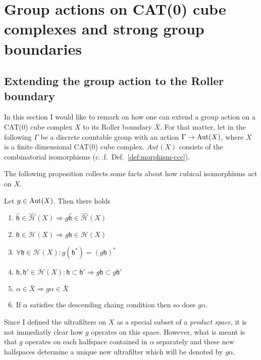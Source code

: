 \section{Group actions on CAT(0) cube complexes and strong group boundaries}
\label{sec:group}

\subsection{Extending the group action to the Roller boundary}
\label{sec:ga-roller}

In this section I would like to remark on how one can extend a group action on a CAT(0) cube complex \(X\) to its Roller boundary \(\bar X\). For that matter, let in the following \(\Gamma\) be a discrete countable group with an action \(\Gamma \to \operatorname{Aut}(X)\), where \(X\) is a finite dimensional CAT(0) cube complex. \(Aut(X)\) consists of the combinatorial isomorphisms (c.\,.f.\ Def.~\ref{def:morphism-ccc}).

The following proposition collects some facts about how cubical isomorphisms act on \(X\).

\begin{prop}
  Let \(g \in \operatorname{Aut}(X)\). Then there holds
  \begin{enumerate}
  \item \(\mathfrak{\hat h} \in \mathcal{\hat H}(X) \Rightarrow  g\mathfrak{\hat h} \in \mathcal{\hat H}(X)\)
  \item \(\mathfrak{h} \in \mathcal{H}(X) \Rightarrow  g\mathfrak{h} \in \mathcal{H}(X)\)
  \item \(\forall \mathfrak{h} \in \mathcal{H}(X)\colon g(\mathfrak{h}^\ast) = (g\mathfrak{h})^\ast\)
  \item \(\mathfrak{h,h'} \in \mathcal{H}(X)\colon \mathfrak{h} \subset \mathfrak{h'} \Rightarrow g\mathfrak{h} \subset g\mathfrak{h'}\)
  \item \(\alpha \in \bar X \Rightarrow g\alpha \in \bar X\)
  \item If \(\alpha\) satisfies the descending chaing condition then so does \(g\alpha\).
  \end{enumerate}
\end{prop}

\begin{rem}
  Since I defined the ultrafilters on \(X\) as a special subset of a \emph{product space}, it is not immediatly clear how \(g\) operates on this space. However, what is meant is that \(g\) operates on each halfspace contained in \(\alpha\) separately and these new halfspaces determine a unique new ultrafilter which will be denoted by \(g\alpha\).
\end{rem}

